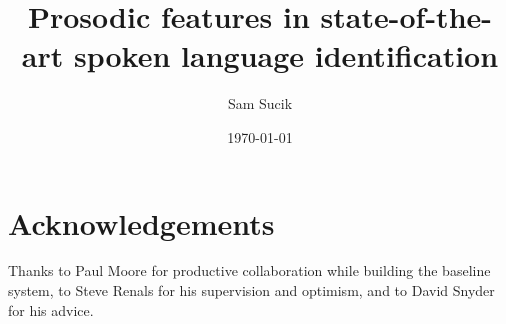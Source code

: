 \documentclass[bsc,frontabs,twoside,singlespacing,parskip,deptreport]{infthesis}
\begin{document}
\title{Prosodic features in state-of-the-art spoken language identification}

\author{Sam Sucik}


\date{\today}


\maketitle

\section*{Acknowledgements}{
  Thanks to Paul Moore for productive collaboration while building the baseline system, to Steve Renals for his supervision and optimism, and to David Snyder for his advice.
}

\tableofcontents

\end{document}
